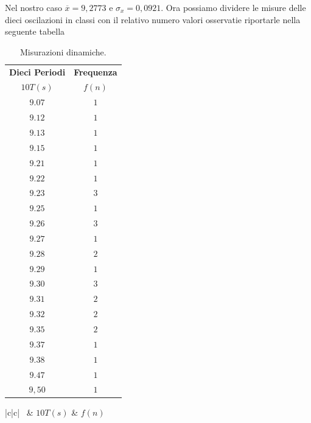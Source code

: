 \documentclass[12pt, a4paper]{article}
\begin{document}
\smallskip
Nel nostro caso $\overline{x} = 9,2773$ e $\sigma_x = 0,0921 $. 
Ora possiamo dividere le misure delle dieci oscilazioni in classi con il relativo numero valori osservatie  riportarle  nella seguente tabella  


\begin{table}[hbt!]
    \centering
    {\renewcommand\arraystretch{1.0} 
    \begin{tabular}{|c|c|}
    \hline
        \textbf{Dieci Periodi} & \textbf{Frequenza}\\
        $10T(s)$ & $f(n)$\\
    \hline
    $ 9.07 $ & $ 1 $ \\ 
    $ 9.12 $ & $ 1 $ \\
    $ 9.13 $ & $ 1 $ \\
    $ 9.15 $ & $ 1 $ \\ 
    $ 9.21 $ & $ 1 $ \\
    $ 9.22 $ & $ 1 $ \\
    $ 9.23 $ & $ 3 $ \\
    $ 9.25 $ & $ 1 $ \\
    $ 9.26 $ & $ 3 $ \\
    $ 9.27 $ & $ 1 $ \\
    $ 9.28 $ & $ 2 $ \\
    $ 9.29 $ & $ 1 $ \\
    $ 9.30 $ & $ 3 $ \\ 
    $ 9.31 $ & $ 2 $ \\
    $ 9.32 $ & $ 2 $ \\
    $ 9.35 $ & $ 2 $ \\
    $ 9.37 $ & $ 1 $ \\
    $ 9.38 $ & $ 1 $ \\
    $ 9.47 $ & $ 1 $ \\
    $ 9,50 $ & $ 1 $ \\ 
    \hline
    \end{tabular}}
    \caption{Misurazioni dinamiche.}
    \label{tab: Misure Dinamiche}
\end{table}


\begin{table}[hbt!]
    \centering
    {\renewcommand\arraystretch{1.0} 
    \begin{tabular}{|c|c|}
    \hline
        \ & \textbf{}
        $10T(s)$ & $f(n)$\\
    \hline 
    \hline
    \end{tabular}}
    \caption{Misurazioni dinamiche.}
    \label{tab: Classi}
\end{table}
\end{document}
